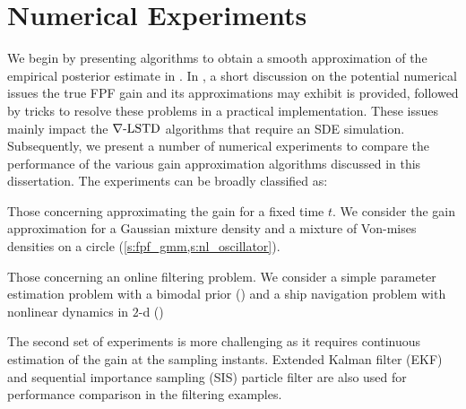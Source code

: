 \section{Numerical Experiments}
\label{s:fpf_numerics}
We begin by presenting algorithms to obtain a smooth approximation of the empirical posterior estimate in . In , a short discussion on the potential numerical issues the true FPF gain and its approximations may exhibit is provided, followed by tricks to resolve these problems in a practical implementation. These issues mainly impact the $\nabla\text{-LSTD}$ algorithms that require an SDE simulation. Subsequently, we present a number of numerical experiments to compare the performance of the various gain approximation algorithms discussed in this dissertation. The experiments can be broadly classified as:
\begin{arabnum}
 \item Those concerning approximating the gain for a fixed time $t$. We consider the gain approximation for a Gaussian mixture density and a mixture of Von-mises densities on a circle (\cref{s:fpf_gmm,s:nl_oscillator}).  
 \item Those concerning an online filtering problem. We consider a simple parameter estimation problem with a bimodal prior () and a ship navigation problem with nonlinear dynamics in $2$-d ()  
\end{arabnum}
The second set of experiments is more challenging as it requires continuous estimation of the gain at the sampling instants. Extended Kalman filter (EKF) and sequential importance sampling (SIS) particle filter are also used for performance comparison in the filtering examples.  
